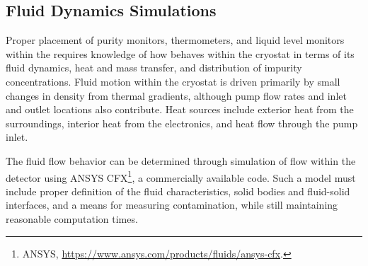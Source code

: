 \subsection{Fluid Dynamics Simulations}
\label{sec:fdgen-slow-cryo-cfd}

Proper placement of purity monitors, thermometers, and liquid level monitors within the  requires knowledge of how  behaves within the cryostat in terms of its fluid dynamics, heat and mass transfer, and distribution of impurity concentrations. 
Fluid motion within the cryostat is driven primarily by small changes in density from thermal gradients, although pump flow rates and inlet and outlet locations also contribute. 
Heat sources include exterior heat from the surroundings, interior heat from the electronics, and heat flow through the pump inlet.

The fluid flow behavior can be determined through simulation of  flow within the detector using ANSYS CFX\footnote{ANSYS\texttrademark{}, \url{https://www.ansys.com/products/fluids/ansys-cfx}.}, a commercially available  code. Such a model must include proper definition of the fluid characteristics, solid bodies and fluid-solid interfaces, and a means for measuring contamination, while still maintaining reasonable computation times. 

